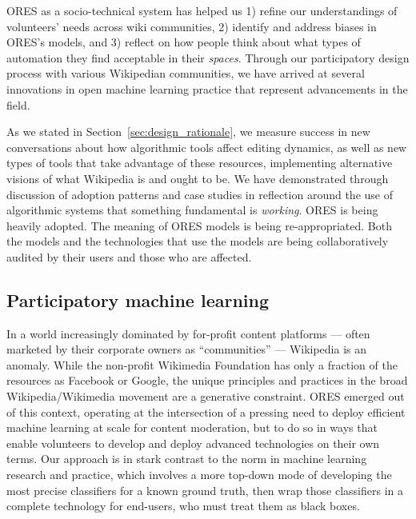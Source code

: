 ORES as a socio-technical system has helped us 1) refine our understandings of volunteers' needs across wiki communities, 2) identify and address biases in ORES's models, and 3) reflect on how people think about what types of automation they find acceptable in their \emph{spaces}.  Through our participatory design process with various Wikipedian communities, we have arrived at several innovations in open machine learning practice that represent advancements in the field.

As we stated in Section~\ref{sec:design_rationale}, we measure success in new conversations about how algorithmic tools affect editing dynamics, as well as new types of tools that take advantage of these resources, implementing alternative visions of what Wikipedia is and ought to be.  We have demonstrated through discussion of adoption patterns and case studies in reflection around the use of algorithmic systems that something fundamental is \emph{working}.  ORES is being heavily adopted.  The meaning of ORES models is being re-appropriated.  Both the models and the technologies that use the models are being collaboratively audited by their users and those who are affected.

\subsection{Participatory machine learning}
In a world increasingly dominated by for-profit content platforms --- often marketed by their corporate owners as ``communities'' \cite{gillespie2018custodians} --- Wikipedia is an anomaly. While the non-profit Wikimedia Foundation has only a fraction of the resources as Facebook or Google, the unique principles and practices in the broad Wikipedia/Wikimedia movement are a generative constraint. ORES emerged out of this context, operating at the intersection of a pressing need to deploy efficient machine learning at scale for content moderation, but to do so in ways that enable volunteers to develop and deploy advanced technologies on their own terms. Our approach is in stark contrast to the norm in machine learning research and practice, which involves a more top-down mode of developing the most precise classifiers for a known ground truth, then wrap those classifiers in a complete technology for end-users, who must treat them as black boxes.

